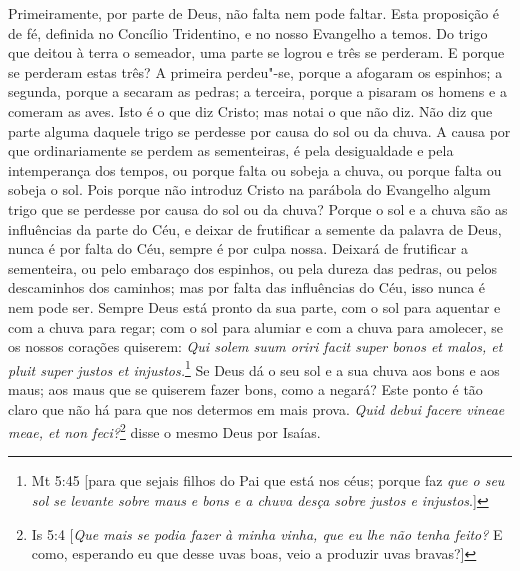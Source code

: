 Primeiramente, por parte de Deus, não falta nem pode faltar. Esta
proposição é de fé, definida no Concílio Tridentino, e no nosso
Evangelho a temos. Do trigo que deitou à terra o semeador, uma parte se
logrou e três se perderam. E porque se perderam estas três? A
primeira perdeu"-se, porque a afogaram os espinhos; a segunda, porque a
secaram as pedras; a terceira, porque a pisaram os homens e a comeram
as aves. Isto é o que diz Cristo; mas notai o que não diz. Não diz que
parte alguma daquele trigo se perdesse por causa do sol ou da chuva. A
causa por que ordinariamente se perdem as sementeiras, é pela
desigualdade e pela intemperança dos tempos, ou porque falta ou sobeja a
chuva, ou porque falta ou sobeja o sol. Pois porque não introduz Cristo
na parábola do Evangelho algum trigo que se perdesse por causa do sol ou
da chuva? Porque o sol e a chuva são as influências da parte do Céu,
e deixar de frutificar a semente da palavra de Deus, nunca é por falta
do Céu, sempre é por culpa nossa. Deixará de frutificar a sementeira, ou
pelo embaraço dos espinhos, ou pela dureza das pedras, ou pelos
descaminhos dos caminhos; mas por falta das influências do Céu, isso
nunca é nem pode ser. Sempre Deus está pronto da sua parte, com o sol
para aquentar e com a chuva para regar; com o sol para alumiar e com a
chuva para amolecer, se os nossos corações quiserem: \emph{Qui solem
suum oriri facit super bonos et malos, et pluit super justos et
injustos.}\footnote{Mt 5:45 [para que sejais filhos do Pai que está nos céus; porque faz \textit{que o seu sol se levante sobre maus e bons e a chuva desça sobre justos e injustos}.]} Se Deus dá o seu sol e a sua chuva aos
bons e aos maus; aos maus que se quiserem fazer bons, como a negará?
Este ponto é tão claro que não há para que nos determos em mais prova.
\emph{Quid debui facere vineae meae, et non feci?}\footnote{Is 5:4 [\textit{Que mais se podia fazer à minha vinha, que eu lhe não tenha feito?} E como, esperando eu
que desse uvas boas, veio a produzir uvas bravas?]}
disse o mesmo Deus por Isaías.

